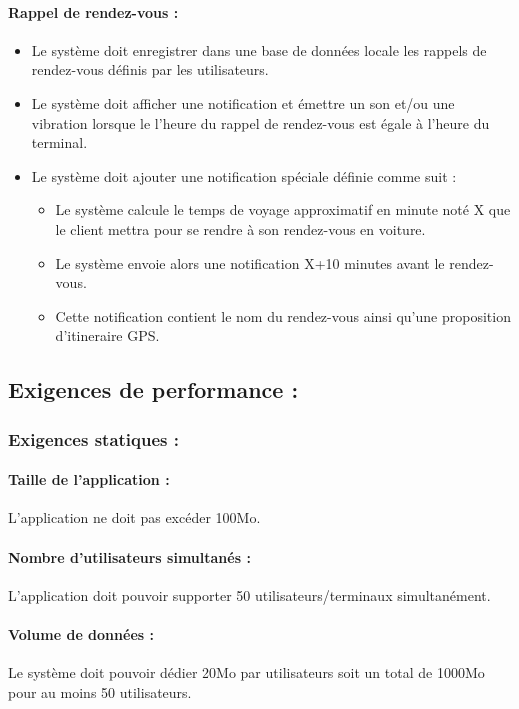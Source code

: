 \documentclass{article}
\begin{document}
\paragraph{Rappel de rendez-vous :}
\begin{itemize}
\item Le système doit enregistrer dans une base de données locale les
  rappels de rendez-vous définis par les utilisateurs.
\item Le système doit afficher une notification et émettre un son
  et/ou une vibration lorsque le l'heure du rappel de rendez-vous est
  égale à l'heure du terminal.
\item Le système doit ajouter une notification spéciale définie
  comme suit :
  \begin{itemize}
    \item Le système calcule le temps de voyage approximatif en minute
      noté X que le
      client mettra pour se rendre à son rendez-vous en voiture.
     \item Le système envoie alors une notification X+10 minutes avant
       le rendez-vous.
     \item Cette notification contient le nom du rendez-vous ainsi
       qu'une proposition d'itineraire GPS.
  \end{itemize}

\end{itemize}

\subsection{Exigences de performance :}
\subsubsection{Exigences statiques :}
\paragraph{Taille de l'application :}
L'application ne doit pas excéder 100Mo.
\paragraph{Nombre d'utilisateurs simultanés :}
L'application doit pouvoir supporter 50 utilisateurs/terminaux
simultanément.
\paragraph{Volume de données :}
Le système doit pouvoir dédier 20Mo par utilisateurs soit un total de
1000Mo pour au moins 50 utilisateurs.
\end{document}
